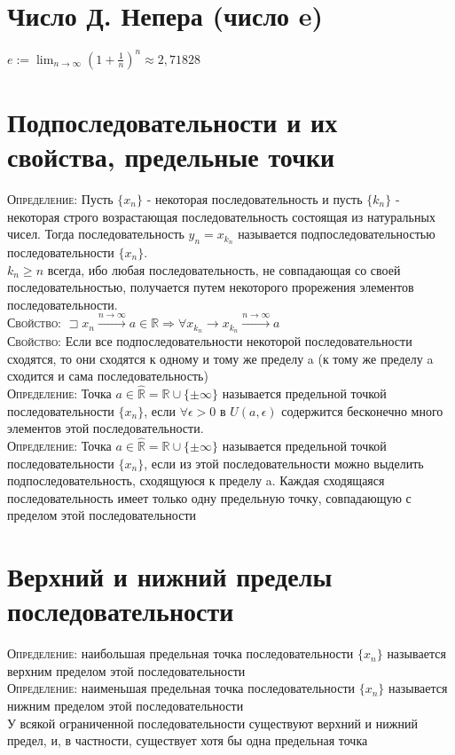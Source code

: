 \documentclass[14pt]{article}
\begin{document}
    \section{Число Д. Непера (число e)}
        $e:=\lim_{n\rightarrow \infty} (1 + \frac{1}{n})^n \approx 2,71828$

    \section{Подпоследовательности и их свойства, предельные точки}
        \textsc{Определение:} Пусть $\{x_n\}$ - некоторая последовательность и пусть $\{k_n\}$ - некоторая строго возрастающая последовательность состоящая из натуральных чисел. Тогда последовательность $y_n = x_{k_n}$ называется подпоследовательностью последовательности $\{x_n\}$. \\
        $k_n \geqslant n$ всегда, ибо любая последовательность, не совпадающая со своей последовательностью, получается путем некоторого прорежения элементов последовательности.  \\
        \textsc{Свойство:} $\sqsupset  x_n \xrightarrow{n \rightarrow \infty} a \in \mathbb{R} \Rightarrow \forall x_{k_n} \rightarrow x_{k_n} \xrightarrow{n \rightarrow \infty} a$ \\
        \textsc{Свойство:} Если все подпоследовательности некоторой последовательности сходятся, то они сходятся к одному и тому же пределу a (к тому же пределу a сходится и сама последовательность) \\
        \textsc{Определение:} Точка $a \in \widehat{\mathbb{R}} = \mathbb{R} \cup \{\pm \infty \}$ называется предельной точкой последовательности $\{x_n\}$, если $\forall \epsilon > 0 $ в $ U(a, \epsilon)$ содержится бесконечно много элементов этой последовательности. \\ 
        \textsc{Определение:} Точка $a \in \widehat{\mathbb{R}} = \mathbb{R} \cup \{\pm \infty \}$ называется предельной точкой последовательности $\{x_n\}$, если из этой последовательности можно выделить подпоследовательность, сходящуюся к пределу a.
        Каждая сходящаяся последовательность имеет только одну предельную точку, совпадающую с пределом этой последовательности

    \section{Верхний и нижний пределы последовательности}
        \textsc{Определение:} наибольшая предельная точка последовательности $\{x_n\}$ называется верхним пределом этой последовательности \\
        \textsc{Определение:} наименьшая предельная точка последовательности $\{x_n\}$ называется нижним пределом этой последовательности \\
        У всякой ограниченной последовательности существуют верхний и нижний предел, и, в частности, существует хотя бы одна предельная точка
\end{document}
